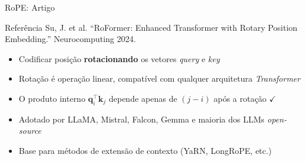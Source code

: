 \documentclass[aspectratio=169, xcolor=dvipsnames]{beamer}
\begin{document}
  \begin{frame}{RoPE: Artigo}
    \begin{block}{Referência}
      Su, J. et al. ``RoFormer: Enhanced Transformer with Rotary Position Embedding.'' Neurocomputing 2024.
    \end{block}
    \begin{itemize}
      \item Codificar posição \textbf{rotacionando} os vetores \textit{query} e \textit{key}
      \item Rotação é operação linear, compatível com qualquer arquitetura \textit{Transformer}
      \item O produto interno $\mathbf{q}_i^\top \mathbf{k}_j$ depende apenas de $(j - i)$ após a rotação $\checkmark$
      \item Adotado por LLaMA, Mistral, Falcon, Gemma e maioria dos LLMs \textit{open-source}
      \item Base para métodos de extensão de contexto (YaRN, LongRoPE, etc.)
    \end{itemize}
  \end{frame}
\end{document}
